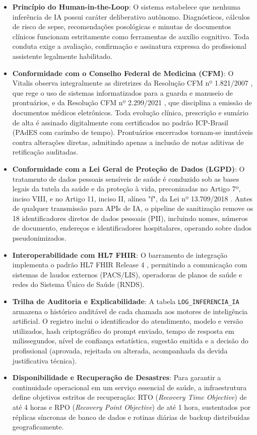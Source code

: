 \begin{itemize}
    \item \textbf{Princípio do Human-in-the-Loop}: O sistema estabelece que nenhuma inferência de IA possui caráter deliberativo autônomo. Diagnósticos, cálculos de risco de sepse, recomendações posológicas e minutas de documentos clínicos funcionam estritamente como ferramentas de auxílio cognitivo. Toda conduta exige a avaliação, confirmação e assinatura expressa do profissional assistente legalmente habilitado.
    \item \textbf{Conformidade com o Conselho Federal de Medicina (CFM)}: O Vitalis observa integralmente as diretrizes da Resolução CFM nº 1.821/2007 \cite{cfm_prontuario:2007}, que rege o uso de sistemas informatizados para a guarda e manuseio de prontuários, e da Resolução CFM nº 2.299/2021 \cite{cfm_digital:2021}, que disciplina a emissão de documentos médicos eletrônicos. Toda evolução clínica, prescrição e sumário de alta é assinado digitalmente com certificados no padrão ICP-Brasil (PAdES com carimbo de tempo). Prontuários encerrados tornam-se imutáveis contra alterações diretas, admitindo apenas a inclusão de notas aditivas de retificação auditadas.
    \item \textbf{Conformidade com a Lei Geral de Proteção de Dados (LGPD)}: O tratamento de dados pessoais sensíveis de saúde é conduzido sob as bases legais da tutela da saúde e da proteção à vida, preconizadas no Artigo 7º, inciso VIII, e no Artigo 11, inciso II, alínea "f", da Lei nº 13.709/2018 \cite{brasil_lgpd:2018}. Antes de qualquer transmissão para APIs de IA, o pipeline de sanitização remove os 18 identificadores diretos de dados pessoais (PII), incluindo nomes, números de documento, endereços e identificadores hospitalares, operando sobre dados pseudonimizados.
    \item \textbf{Interoperabilidade com HL7 FHIR}: O barramento de integração implementa o padrão HL7 FHIR Release 4 \cite{hl7_fhir:2019}, permitindo a comunicação com sistemas de laudos externos (PACS/LIS), operadoras de planos de saúde e redes do Sistema Único de Saúde (RNDS).
    \item \textbf{Trilha de Auditoria e Explicabilidade}: A tabela \texttt{LOG\_INFERENCIA\_IA} armazena o histórico auditável de cada chamada aos motores de inteligência artificial. O registro inclui o identificador do atendimento, modelo e versão utilizados, hash criptográfico do prompt enviado, tempo de resposta em milissegundos, nível de confiança estatística, sugestão emitida e a decisão do profissional (aprovada, rejeitada ou alterada, acompanhada da devida justificativa técnica).
    \item \textbf{Disponibilidade e Recuperação de Desastres}: Para garantir a continuidade operacional em um serviço essencial de saúde, a infraestrutura define objetivos estritos de recuperação: RTO (\textit{Recovery Time Objective}) de até 4 horas e RPO (\textit{Recovery Point Objective}) de até 1 hora, sustentados por réplicas síncronas de banco de dados e rotinas diárias de backup distribuídas geograficamente.
\end{itemize}
